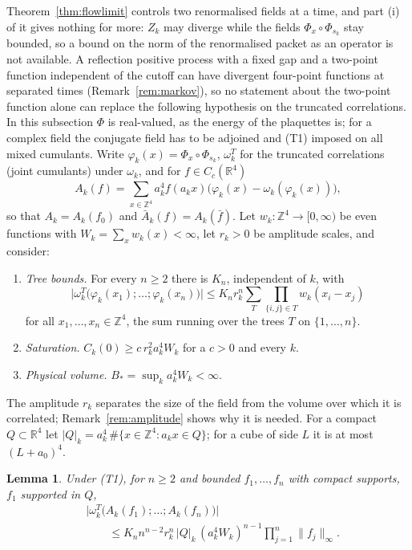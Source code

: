 \documentclass[aps,prd,twocolumn,superscriptaddress,nofootinbib,longbibliography,floatfix,amsmath,amssymb,10pt]{revtex4-2}
\newtheorem{lemma}[theorem]{Lemma}
\theoremstyle{definition}
\theoremstyle{remark}
\newcommand{\R}{\mathbb{R}}
\newcommand{\Z}{\mathbb{Z}}
\begin{document}
Theorem~\ref{thm:flowlimit} controls two renormalised fields at a time, and
part (i) of it gives nothing for more: $Z_k$ may diverge while the fields
$\Phi_x\circ\Phi_{s_k}$ stay bounded, so a bound on the norm of the
renormalised packet as an operator is not available. A reflection positive
process with a fixed gap and a two-point function independent of the
cutoff can have divergent four-point functions at separated times
(Remark~\ref{rem:markov}), so no statement about the two-point function alone
can replace the following hypothesis on the truncated correlations. In this
subsection $\Phi$ is real-valued, as the energy of the plaquettes is; for a
complex field the conjugate field has to be adjoined and (T1) imposed on all
mixed cumulants. Write $\varphi_k(x)=\Phi_x\circ\Phi_{s_k}$,
$\omega^T_k$ for the truncated correlations (joint cumulants) under
$\omega_k$, and for $f\in C_c(\R^4)$
\[
A_k(f)=\sum_{x\in\Z^4}a_k^4f(a_kx)\bigl(\varphi_k(x)-\omega_k(\varphi_k(x))\bigr),
\]
so that $A_k=A_k(f_0)$ and $\bar A_k(f)=A_k(\bar f)$. Let
$w_k:\Z^4\to[0,\infty)$ be even functions with $W_k=\sum_xw_k(x)<\infty$, let
$r_k>0$ be amplitude scales, and consider:
\begin{enumerate}[label=\textup{(T\arabic*)},leftmargin=*]
\item \emph{Tree bounds.} For every $n\ge2$ there is $K_n$, independent of $k$,
with
\[
\bigl|\omega^T_k\bigl(\varphi_k(x_1);\dots;\varphi_k(x_n)\bigr)\bigr|
\le K_nr_k^n\sum_{T}\prod_{\{i,j\}\in T}w_k(x_i-x_j)
\]
for all $x_1,\dots,x_n\in\Z^4$, the sum running over the trees $T$ on
$\{1,\dots,n\}$.
\item \emph{Saturation.} $C_k(0)\ge c\,r_k^2a_k^4W_k$ for a $c>0$ and every $k$.
\item \emph{Physical volume.} $B_*=\sup_ka_k^4W_k<\infty$.
\end{enumerate}
The amplitude $r_k$ separates the size of the field from the volume over
which it is correlated; Remark~\ref{rem:amplitude} shows why it is needed.
For a compact $Q\subset\R^4$ let $|Q|_k=a_k^4\,\#\{x\in\Z^4:a_kx\in Q\}$; for a
cube of side $L$ it is at most $(L+a_0)^4$.

\begin{lemma}\label{lem:treesum}
Under \textup{(T1)}, for $n\ge2$ and bounded $f_1,\dots,f_n$ with compact
supports, $f_1$ supported in $Q$,
\[
\begin{split}
&\bigl|\omega^T_k\bigl(A_k(f_1);\dots;A_k(f_n)\bigr)\bigr|\\
&\qquad\le K_nn^{n-2}r_k^n\,|Q|_k\,(a_k^4W_k)^{n-1}\prod_{j=1}^n\|f_j\|_\infty .
\end{split}
\]
\end{lemma}
\end{document}
